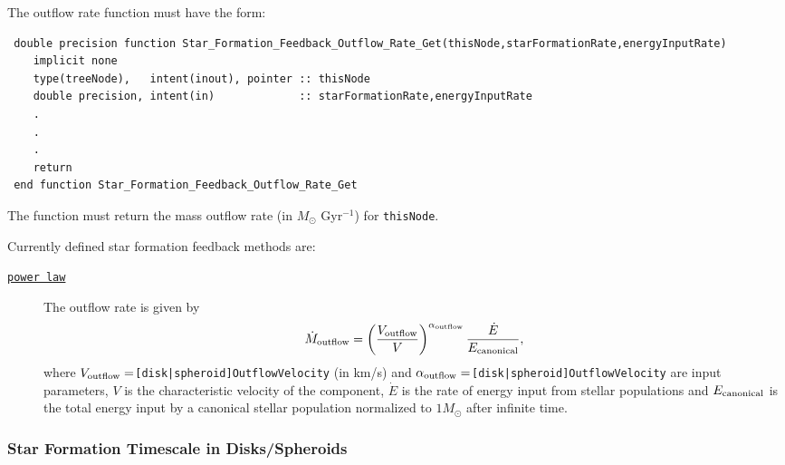 The outflow rate function must have the form:
\begin{verbatim}
 double precision function Star_Formation_Feedback_Outflow_Rate_Get(thisNode,starFormationRate,energyInputRate)
    implicit none
    type(treeNode),   intent(inout), pointer :: thisNode
    double precision, intent(in)             :: starFormationRate,energyInputRate
    .
    .
    .
    return
 end function Star_Formation_Feedback_Outflow_Rate_Get
\end{verbatim}
The function must return the mass outflow rate (in $M_\odot$ Gyr$^{-1}$) for {\tt thisNode}.

Currently defined star formation feedback methods are:
\begin{description}
 \item [\hyperlink{star_formation.feedback.spheroids.power_law.F90:star_formation_feedback_spheroids_power_law:star_formation_feedback_spheroid_outflow_rate_power_law}{{\tt power law}}] The outflow rate is given by
\begin{equation}
 \dot{M}_{\rm outflow} = \left({V_{\rm outflow} \over V}\right)^{\alpha_{\rm outflow}} {\dot{E} \over E_{\rm canonical}},
\end{equation}
where $V_{\rm outflow}=${\tt [disk|spheroid]OutflowVelocity} (in km/s) and $\alpha_{\rm outflow}=${\tt [disk|spheroid]OutflowVelocity} are input parameters, $V$ is the characteristic velocity of the component, $\dot{E}$ is the rate of energy input from stellar populations and $E_{\rm canonical}$ is the total energy input by a canonical stellar population normalized to $1 M_\odot$ after infinite time.
\end{description}

\subsubsection{Star Formation Timescale in Disks/Spheroids}

